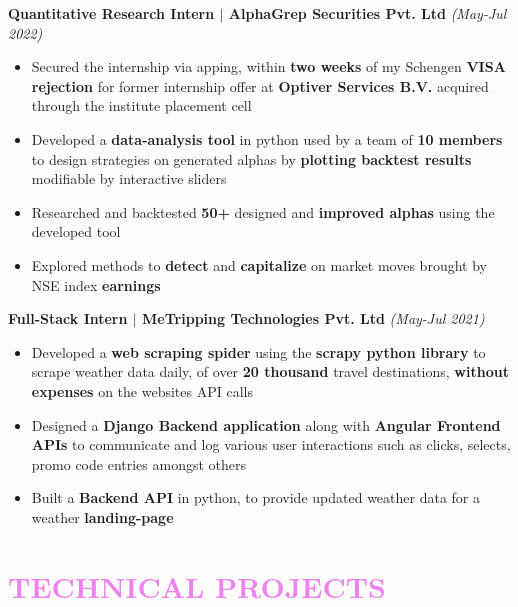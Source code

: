 \documentclass[a4paper,11pt]{article}
\begin{document}
\textbf{Quantitative Research Intern $\mid$ AlphaGrep Securities Pvt. Ltd} \hfill \emph{(May-Jul 2022)}
\vspace{-5pt}
\begin{itemize}[noitemsep]
    \item Secured the internship via apping, within \textbf{two weeks} of my Schengen \textbf{VISA rejection} for former internship offer at \textbf{Optiver Services B.V.} acquired through the institute placement cell
    \item Developed a \textbf{data-analysis tool} in python used by a team of \textbf{10 members} to design strategies on generated alphas by \textbf{plotting backtest results} modifiable by interactive sliders
    \item Researched and backtested \textbf{50+} designed and \textbf{improved alphas} using the developed tool 
    \item Explored methods to \textbf{detect} and \textbf{capitalize} on market moves brought by NSE index \textbf{earnings}
\end{itemize}
\vspace{-3pt}

\textbf{Full-Stack Intern $\mid$ MeTripping Technologies Pvt. Ltd} \hfill \emph{(May-Jul 2021)}
\vspace{-5pt}
\begin{itemize}[noitemsep]
    \item Developed a \textbf{web scraping spider} using the \textbf{scrapy python library} to scrape  weather data daily, of over \textbf{20 thousand} travel destinations, \textbf{without expenses} on the websites API calls
    \item Designed a \textbf{Django Backend application} along with \textbf{Angular Frontend APIs} to communicate and log various user interactions such as clicks, selects, promo code entries amongst others
    \item Built a \textbf{Backend API} in python, to provide updated weather data for a weather \textbf{landing-page}
\end{itemize}
\vspace{-5mm}

\section{\textcolor{Violet}{\bf{\Large{T}\large{ECHNICAL} \Large{P}\large{ROJECTS}}}}
\vspace{-5pt}
\end{document}
